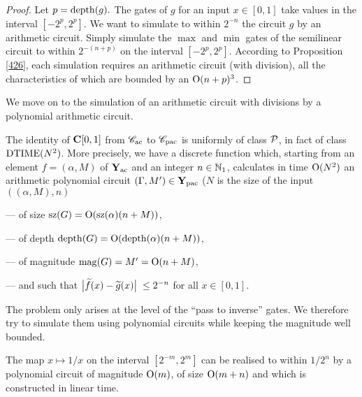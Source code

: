 \begin{proof}
Let $ p = {\rm depth}(g). $ The gates of $ g $ for an input $x \in [0,1]$ take values in the interval 
$[-2^p,2^p]$. 
We want to simulate to within $2^{-n}$ the circuit $g$ by an arithmetic circuit. 
 Simply simulate the $\max$ and $\min$ gates of the 
semilinear circuit to within $2^{-(n+p)}$ on the interval $[-2^p,2^p]$. 
According to Proposition \ref{426}, each simulation requires an 
arithmetic circuit (with division), all the characteristics of which are 
bounded by an ${\rm O}(n+p)^3$.	
\end{proof}
%

We move on to the simulation of an arithmetic circuit with divisions by a polynomial arithmetic circuit.

\begin{proposition} \label{428}
The identity of ${{\bf C}[0,1]}$ from ${{{\mathscr C}}_{\rm ac}}$ to ${{{\mathscr C}}_{\rm pac}}$ is uniformly of class ${\cal P}$, in fact of class ${\rm DTIME} (N^2)$. 
More precisely, we have a discrete function which, starting from an element 
 $f=(\alpha,M)$ of ${{\bf Y}_{\rm ac}}$ and an integer 
$n\in\mathbb {N}_1$, calculates in time ${\rm O}(N^2)$ an arithmetic polynomial circuit $(\Gamma, M') \in {{\bf Y}_{\rm pac}} $ ($N$ is the size of the input $((\alpha,M),n)$ 

\noindent 
--- of size $ {\rm sz}(G) = {\rm O}( {\rm sz}(\alpha) (n + M) ) $, 

\noindent 
--- of depth $ {\rm depth}(G) = {\rm O}( {\rm depth}(\alpha) (n + M) ) $, 

\noindent 
--- of magnitude $ {\rm mag}(G) = M'= {\rm O}( n + M ) $, 

\noindent 
--- and such that $\big|{ \widetilde{f}(x) - \widetilde{g}(x) }\big|\;  \leq 2^{-n}$ 
for all $x \in [0,1]$.
\end{proposition} 

The problem only arises at the level of the ``pass to inverse'' gates. 
We therefore try to simulate them using polynomial circuits while 
keeping the magnitude well bounded.

\begin{lemma} \label{429}
The map $ x \mapsto 1/x $ on the interval $[2^{-m}, 2^m]$ can be 
realised to within $ 1/2^n $ by a polynomial circuit of 
magnitude $ {\rm O}(m)$, of size $ {\rm O}(m+n) $ and which is constructed in 
linear time.
\end{lemma}


